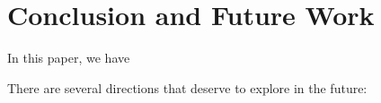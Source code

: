 \section{Conclusion and Future Work}
\label{sec:conclusion}

In this paper, we have


There are several directions that deserve to explore in the future: